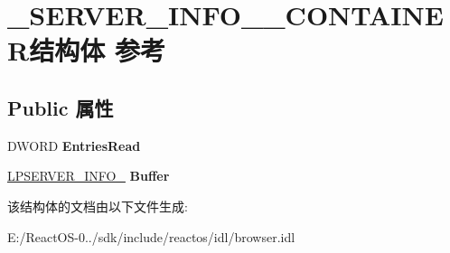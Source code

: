 \hypertarget{struct___s_e_r_v_e_r___i_n_f_o__100___c_o_n_t_a_i_n_e_r}{}\section{\+\_\+\+S\+E\+R\+V\+E\+R\+\_\+\+I\+N\+F\+O\+\_\+\_\+\+C\+O\+N\+T\+A\+I\+N\+E\+R结构体 参考}
\label{struct___s_e_r_v_e_r___i_n_f_o__100___c_o_n_t_a_i_n_e_r}
\subsection*{Public 属性}
\begin{DoxyCompactItemize}
\item 
\mbox{\label{struct___s_e_r_v_e_r___i_n_f_o__100___c_o_n_t_a_i_n_e_r_a0cf710efe56abde6e8d23b97c7af9a4a}} 
D\+W\+O\+RD {\bfseries Entries\+Read}
\item 
\mbox{\label{struct___s_e_r_v_e_r___i_n_f_o__100___c_o_n_t_a_i_n_e_r_a22302f12511b5a530e80d11475101f09}} 
\hyperlink{struct___s_e_r_v_e_r___i_n_f_o__100}{L\+P\+S\+E\+R\+V\+E\+R\+\_\+\+I\+N\+F\+O\+\_} {\bfseries Buffer}
\end{DoxyCompactItemize}


该结构体的文档由以下文件生成\+:\begin{DoxyCompactItemize}
\item 
E\+:/\+React\+O\+S-\/0../sdk/include/reactos/idl/browser.\+idl\end{DoxyCompactItemize}
